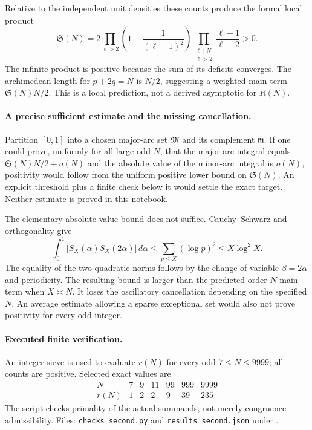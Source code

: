 \documentclass[11pt,a4paper]{article}
\begin{document}
Relative to the independent unit densities these counts produce the
formal local product
\[
 \mathfrak S(N)=2\prod_{\ell>2}\left(1-\frac1{(\ell-1)^2}\right)
               \prod_{\substack{\ell\mid N\\\ell>2}}
                    \frac{\ell-1}{\ell-2}>0.
\]
The infinite product is positive because the sum of its deficits
converges. The archimedean length for $p+2q=N$ is $N/2$, suggesting
a weighted main term $\mathfrak S(N)N/2$. This is a local prediction,
not a derived asymptotic for $R(N)$.

\paragraph{A precise sufficient estimate and the missing cancellation.}
Partition $[0,1]$ into a chosen major-arc set $\mathfrak M$ and its
complement $\mathfrak m$. If one could prove, uniformly for all large
odd $N$, that the major-arc integral equals
$\mathfrak S(N)N/2+o(N)$ and the absolute value of the minor-arc
integral is $o(N)$, positivity would follow from the uniform positive
lower bound on $\mathfrak S(N)$. An explicit threshold plus a finite
check below it would settle the exact target. Neither estimate is
proved in this notebook.

The elementary absolute-value bound does not suffice. Cauchy--Schwarz
and orthogonality give
\[
 \int_0^1|S_X(\alpha)S_X(2\alpha)|\,d\alpha
 \le\sum_{p\le X}(\log p)^2\le X\log^2X.
\]
The equality of the two quadratic norms follows by the change of
variable $\beta=2\alpha$ and periodicity. The resulting bound is
larger than the predicted order-$N$ main term when $X\asymp N$.
It loses the oscillatory cancellation depending on the specified $N$.
An average estimate allowing a sparse exceptional set would also not
prove positivity for every odd integer.

\paragraph{Executed finite verification.}
An integer sieve is used to evaluate $r(N)$ for every odd
$7\le N\le9999$; all counts are positive. Selected exact values are
\[
\begin{array}{c|rrrrrr}
 N&7&9&11&99&999&9999\\\hline
 r(N)&1&2&2&9&39&235
\end{array}
\]
The script checks primality of the actual summands, not merely
congruence admissibility. Files: \texttt{checks\_second.py} and
\texttt{results\_second.json} under
.
\end{document}
